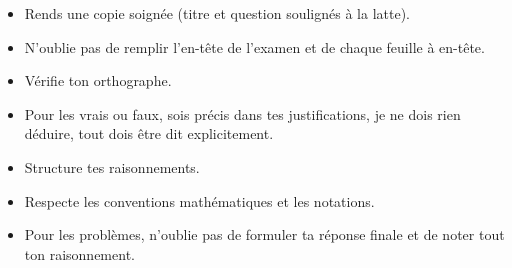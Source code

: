 \documentclass[a4paper, 12pt, parskip=half-]{scrartcl}
\begin{document}
\entete
{}
\begin{itemize}
    \item Rends une copie soignée (titre et question soulignés à la latte).
    \item N'oublie pas de remplir l'en-tête de l'examen et de chaque feuille à en-tête.
    \item Vérifie ton orthographe.
    \item Pour les vrais ou faux, sois précis dans tes justifications, je ne dois rien déduire, tout dois être dit explicitement.
    \item Structure tes raisonnements.
    \item Respecte les conventions mathématiques et les notations.
    \item Pour les problèmes, n'oublie pas de formuler ta réponse finale et de noter tout ton raisonnement.
\end{itemize}
\newpage
\end{document}
